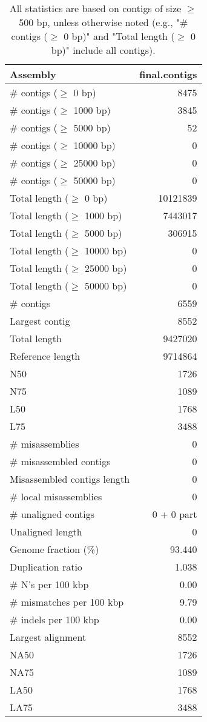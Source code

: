 \documentclass[12pt,a4paper]{article}
\begin{document}
\begin{table}[ht]
\begin{center}
\caption{All statistics are based on contigs of size $\geq$ 500 bp, unless otherwise noted (e.g., "\# contigs ($\geq$ 0 bp)" and "Total length ($\geq$ 0 bp)" include all contigs).}
\begin{tabular}{|l*{1}{|r}|}
\hline
Assembly & final.contigs \\ \hline
\# contigs ($\geq$ 0 bp) & 8475 \\ \hline
\# contigs ($\geq$ 1000 bp) & 3845 \\ \hline
\# contigs ($\geq$ 5000 bp) & 52 \\ \hline
\# contigs ($\geq$ 10000 bp) & 0 \\ \hline
\# contigs ($\geq$ 25000 bp) & 0 \\ \hline
\# contigs ($\geq$ 50000 bp) & 0 \\ \hline
Total length ($\geq$ 0 bp) & 10121839 \\ \hline
Total length ($\geq$ 1000 bp) & 7443017 \\ \hline
Total length ($\geq$ 5000 bp) & 306915 \\ \hline
Total length ($\geq$ 10000 bp) & 0 \\ \hline
Total length ($\geq$ 25000 bp) & 0 \\ \hline
Total length ($\geq$ 50000 bp) & 0 \\ \hline
\# contigs & 6559 \\ \hline
Largest contig & 8552 \\ \hline
Total length & 9427020 \\ \hline
Reference length & 9714864 \\ \hline
N50 & 1726 \\ \hline
N75 & 1089 \\ \hline
L50 & 1768 \\ \hline
L75 & 3488 \\ \hline
\# misassemblies & 0 \\ \hline
\# misassembled contigs & 0 \\ \hline
Misassembled contigs length & 0 \\ \hline
\# local misassemblies & 0 \\ \hline
\# unaligned contigs & 0 + 0 part \\ \hline
Unaligned length & 0 \\ \hline
Genome fraction (\%) & 93.440 \\ \hline
Duplication ratio & 1.038 \\ \hline
\# N's per 100 kbp & 0.00 \\ \hline
\# mismatches per 100 kbp & 9.79 \\ \hline
\# indels per 100 kbp & 0.00 \\ \hline
Largest alignment & 8552 \\ \hline
NA50 & 1726 \\ \hline
NA75 & 1089 \\ \hline
LA50 & 1768 \\ \hline
LA75 & 3488 \\ \hline
\end{tabular}
\end{center}
\end{table}
\end{document}
